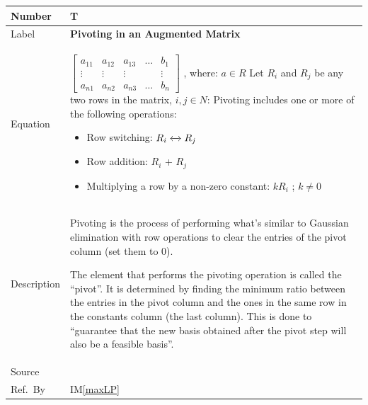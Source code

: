 \documentclass[12pt]{article}
\newcommand{\colAwidth}{0.13\textwidth}
\newcommand{\colBwidth}{0.82\textwidth}
\newcounter{theorynum} %
\newcommand{\iref}[1]{IM\ref{#1}}
\begin{document}
\noindent
\begin{minipage}{\textwidth}
	\renewcommand*{\arraystretch}{1.5}
	\begin{tabular}{| p{\colAwidth} | p{\colBwidth}|}
		\hline
		\rowcolor[gray]{0.9}
		Number& T{theorynum}\thetheorynum \label{T_pivoting}\\
		\hline
		Label&\bf Pivoting in an Augmented Matrix\\
		\hline
		Equation&$\begin{bmatrix}
		a_{11} & a_{12} & a_{13} & \dots & b_{1}\\
		\vdots & \vdots & \vdots & &\vdots\\
		a_{n1} & a_{n2} & a_{n3} & \dots & b_{n}	
		\end{bmatrix}$ , where: $a \in R$ \newline \newline
		Let $R_i$ and $R_j$ be any two rows in the matrix, $i, j \in N$: 
		\newline
		Pivoting includes one or more of the following operations:
		\begin{itemize}
			\item Row switching: $R_i \xleftrightarrow{} R_j$
			
			\item Row addition: $R_i$ + $R_j$
			
			\item Multiplying a row by a non-zero constant: $kR_i$ ; 
			$k \neq 0$
		\end{itemize} \\
		\hline
		Description & 
		Pivoting is the process of performing what's similar to Gaussian 
		elimination with row operations to clear the entries of the pivot 
		column (set them to 0).\newline
		
		The element that performs the pivoting operation is called the 
		``pivot''. It is determined by finding the minimum ratio between the 
		entries in the pivot column and the ones in the same row in the 
		constants column (the last column). This is done to ``guarantee that 
		the new basis obtained after the pivot step will also be a feasible 
		basis''.\\
		\hline
		Source & \cite{lp-book}\\
		\hline
		Ref.\ By & \iref{maxLP}\\
		\hline
	\end{tabular}
\end{minipage}\\
\end{document}
